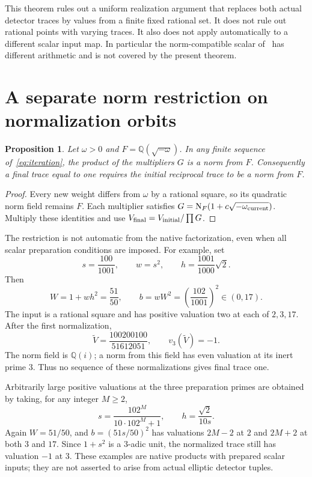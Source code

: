 \documentclass[11pt,a4paper]{article}
\newtheorem{proposition}[theorem]{Proposition}
\newcommand{\Q}{\mathbb Q}\newcommand{\Z}{\mathbb Z}
\begin{document}
This theorem rules out a uniform realization argument that replaces
both actual detector traces by values from a finite fixed rational
set. It does not rule out rational points with varying traces. It
also does not apply automatically to a different scalar input map.
In particular the norm-compatible scalar of~\cite{NormScalar} has
different arithmetic and is not covered by the present theorem.

\section{A separate norm restriction on normalization orbits}

\begin{proposition}\label{prop:normorbit}
Let $\omega>0$ and $F=\Q(\sqrt{-\omega})$. In any finite sequence
of~\eqref{eq:iteration}, the product of the multipliers $G$ is a
norm from $F$. Consequently a final trace equal to one requires
the initial reciprocal trace to be a norm from $F$.
\end{proposition}
\begin{proof}
Every new weight differs from $\omega$ by a rational square, so its
quadratic norm field remains $F$. Each multiplier satisfies
$G=\operatorname{N}_F(1+c\sqrt{-\omega_{\rm current}})$. Multiply these
identities and use $V_{\rm final}=V_{\rm initial}/\prod G$.
\end{proof}

The restriction is not automatic from the native factorization, even
when all scalar preparation conditions are imposed. For example, set
\[
 s=\frac{100}{1001},\qquad w=s^2,\qquad
 h=\frac{1001}{1000}\sqrt2.
\]
Then
\[
 W=1+wh^2=\frac{51}{50},\qquad
 b=wW^2=\left(\frac{102}{1001}\right)^2\in(0,17).
\]
The input is a rational square and has positive valuation two at each
of $2,3,17$. After the first normalization,
\[
 \widetilde V=\frac{100200100}{51612051},\qquad
 v_3(\widetilde V)=-1.
\]
The norm field is $\Q(i)$; a norm from this field has even valuation
at its inert prime $3$. Thus no sequence of these normalizations
gives final trace one.

Arbitrarily large positive valuations at the three preparation primes
are obtained by taking, for any integer $M\ge2$,
\[
 s=\frac{102^M}{10\cdot102^M+1},\qquad
 h=\frac{\sqrt2}{10s}.
\]
Again $W=51/50$, and $b=(51s/50)^2$ has valuations
$2M-2$ at $2$ and $2M+2$ at both $3$ and $17$.
Since $1+s^2$ is a $3$-adic unit, the normalized trace still has
valuation $-1$ at $3$. These examples are native products with
prepared scalar inputs; they are not asserted to arise from actual
elliptic detector tuples.
\end{document}
